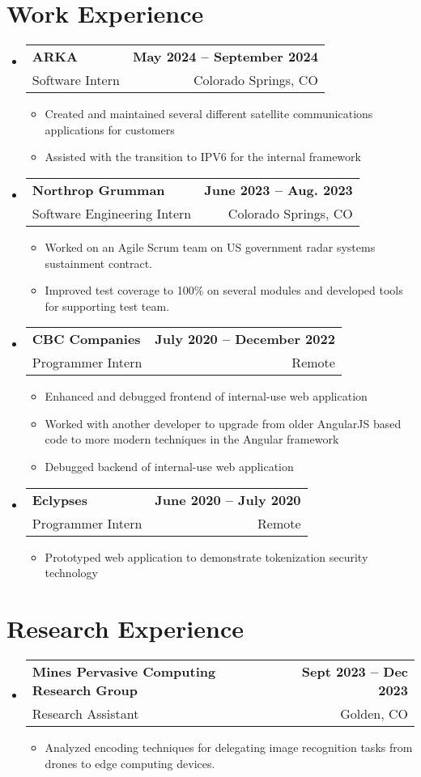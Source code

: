 \documentclass[11pt, letterpaper]{article}
\makeatletter
\newcommand{\resumeItem}[1]{
  \item\small{
    {#1 \vspace{-2pt}}
  }
}
\newcommand{\resumeSubheading}[4]{
  \vspace{-2pt}\item
    \begin{tabular*}{1.0\textwidth}[t]{l@{\extracolsep{\fill}}r}
      \textbf{#1} & \textbf{\small #2} \\
      {\small#3} & {\small #4} \\
    \end{tabular*}\vspace{-7pt}
}
\newcommand{\resumeSubHeadingListStart}{\begin{itemize}[leftmargin=0.0in, label={}]}
\newcommand{\resumeSubHeadingListEnd}{\end{itemize}}
\newcommand{\resumeItemListStart}{\begin{itemize}}
\newcommand{\resumeItemListEnd}{\end{itemize}\vspace{-5pt}}
\makeatother
\begin{document}
\section{Work Experience}   %
  \resumeSubHeadingListStart
    \resumeSubheading
        {ARKA}{May 2024 -- September 2024}
        {Software Intern}{Colorado Springs, CO}
        \resumeItemListStart
            \resumeItem{Created and maintained several different satellite communications applications for customers}
            \resumeItem{Assisted with the transition to IPV6 for the internal framework}
            \resumeItemListEnd
    \resumeSubheading
      {Northrop Grumman}{June 2023 -- Aug. 2023}
      {Software Engineering Intern}{Colorado Springs, CO}
      \resumeItemListStart
        \resumeItem{Worked on an Agile Scrum team on US government radar systems sustainment contract.}
        \resumeItem{Improved test coverage to 100\% on several modules and developed tools for supporting test team.}
        \resumeItemListEnd

    \resumeSubheading
        {CBC Companies }{July 2020 -- December 2022}
        {Programmer Intern}    {Remote}                            \resumeItemListStart           
            \resumeItem{Enhanced and debugged frontend of internal-use web application}
            \resumeItem{Worked with another developer to upgrade from older AngularJS based code to more modern techniques in the Angular framework}
            \resumeItem{Debugged backend of internal-use web application}
        \resumeItemListEnd

    \resumeSubheading
        {Eclypses}{June 2020 -- July 2020}
        {Programmer Intern}{Remote}
        \resumeItemListStart
            \resumeItem{Prototyped web application to demonstrate tokenization security technology}
        \resumeItemListEnd
    
  \resumeSubHeadingListEnd

\section{Research Experience}
  \resumeSubHeadingListStart
    \resumeSubheading
      {Mines Pervasive Computing Research Group}{Sept 2023 -- Dec 2023}
      {Research Assistant}{Golden, CO}
      \resumeItemListStart
        \resumeItem{Analyzed encoding techniques for delegating image recognition tasks from drones to edge computing devices.}
    \resumeItemListEnd
  \resumeSubHeadingListEnd
\end{document}
